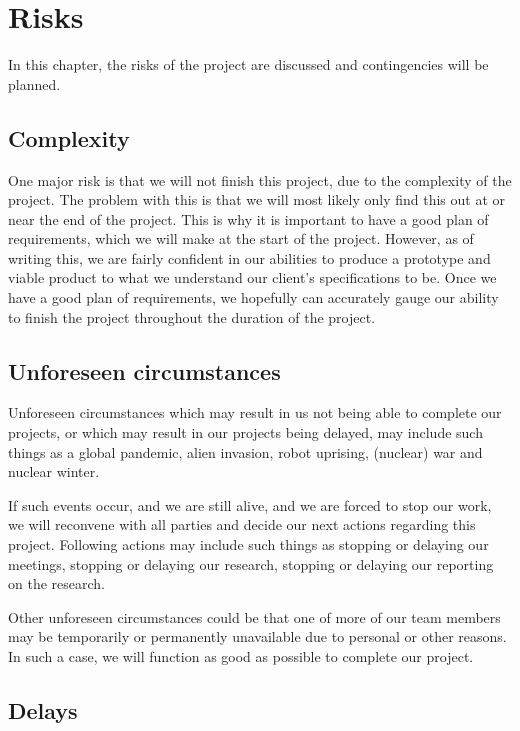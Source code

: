 \chapter{Risks} %

In this chapter, the risks of the project are discussed and contingencies will be planned.

\section{Complexity}

One major risk is that we will not finish this project, due to the complexity
of the project. The problem with this is that we will most likely only find
this out at or near the end of the project. This is why it is important to have
a good plan of requirements, which we will make at the start of the project.
\justify
However, as of writing this, we are fairly confident in our abilities to
produce a prototype and viable product to what we understand our client's
specifications to be.
\justify
Once we have a good plan of requirements, we hopefully can accurately gauge our
ability to finish the project throughout the duration of the project.

\section{Unforeseen circumstances}

Unforeseen circumstances which may result in us not being able to complete
our projects, or which may result in our projects being delayed, may
include such things as a global pandemic, alien invasion, robot uprising,
(nuclear) war and nuclear winter.

\justify
If such events occur, and we are still alive, and we are forced to stop our
work, we will reconvene with all parties and decide our next actions regarding
this project. Following actions may include such things as stopping or delaying
our meetings, stopping or delaying our research, stopping or delaying our
reporting on the research.

\justify
Other unforeseen circumstances could be that one of more of our team members
may be temporarily or permanently unavailable due to personal or other reasons.
In such a case, we will function as good as possible to complete our project.

\section{Delays}

